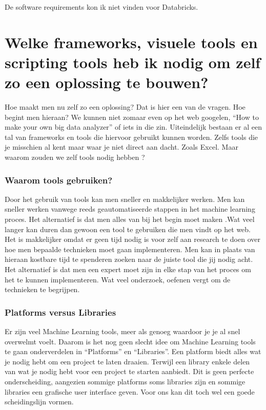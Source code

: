 De software requirements kon ik niet vinden voor Databricks.

\section{Welke frameworks, visuele tools en scripting tools heb ik nodig om zelf zo een oplossing te bouwen?}
\label{ch:Onderzoeksvraag2}
Hoe maakt men nu zelf zo een oplossing? Dat is hier een van de vragen. Hoe begint men hieraan? We kunnen niet zomaar even op het web googelen, “How to make your own big data analyzer” of iets in die zin. Uiteindelijk bestaan er al een tal van frameworks en tools die hiervoor gebruikt kunnen worden. Zelfs tools die je misschien al kent maar waar je niet direct aan dacht. Zoals Excel. Maar waarom zouden we zelf tools nodig hebben ?

\subsubsection{Waarom tools gebruiken?}
Door het gebruik van tools kan men sneller en makkelijker werken.
Men kan sneller werken vanwege reeds geautomatiseerde stappen in het machine learning proces. Het alternatief is dat men alles van bij het begin moet maken .Wat veel langer kan duren dan gewoon een tool te gebruiken die men vindt op het web.
Het is makkelijker omdat er geen tijd nodig is voor zelf aan research te doen over hoe men bepaalde technieken moet gaan implementeren. Men kan in plaats van hieraan kostbare tijd te spenderen zoeken naar de juiste tool die jij nodig acht. Het alternatief is dat men een expert moet zijn in elke stap van het proces om het te kunnen implementeren. Wat veel onderzoek, oefenen vergt om de technieken te begrijpen.

\subsubsection{Platforms versus Libraries}
Er zijn veel Machine Learning tools, meer als genoeg waardoor je je al snel overwelmt voelt. Daarom is het nog geen slecht idee om Machine Learning tools te gaan onderverdelen in “Platforms” en “Libraries”. Een platform biedt alles wat je nodig hebt om een project te laten draaien. Terwijl een library enkele delen van wat je nodig hebt voor een project te starten aanbiedt. Dit is geen perfecte onderscheiding, aangezien sommige platforms soms libraries zijn en sommige libraries een grafische user interface geven. Voor ons kan dit toch wel een goede scheidingslijn vormen.

